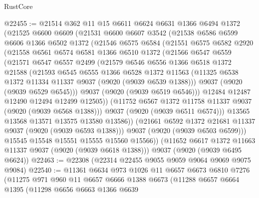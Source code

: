\begin{lexlean}{RustCore}
\begin{coremodule}
@22455 := @21514
    @362
    @11
    @15
    @6611
    @6624
    @6631
    @1366
    @6494
    @1372
    (@21525
      @6600
      @6609
      (@21531
        @6600
        @6607
        @3542
        (@21538
          @6586
          @6599
          @6606
          @1366
          @6502
          @1372
          (@21546
            @6575
            @6584
            (@21551
              @6575
              @6582
              @2920
              (@21558
                @6561
                @6574
                @6581
                @1366
                @6510
                @1372
                (@21566
                  @6547
                  @6559
                  (@21571
                    @6547
                    @6557
                    @2499
                    (@21579
                      @6546
                      @6556
                      @1366
                      @6518
                      @1372
                      @21588
                      (@21593
                        @6545
                        @6555
                        @1366
                        @6528
                        @1372
                        @11563
                        (@11325 @6538 @1372 @11334 @11337 @9037 (@9020 (@9039 @6539 @1388)))
                        @9037
                        (@9020 (@9039 @6529 @6545)))
                      @9037
                      (@9020 (@9039 @6519 @6546)))
                    @12484
                    @12487
                    @12490
                    @12494
                    @12499
                    @12505))
                (@11752 @6567 @1372 @11758 @11337 @9037 (@9020 (@9039 @6568 @1388)))
                @9037
                (@9020 (@9039 @6511 @6574)))
              @13565
              @13568
              @13571
              @13575
              @13580
              @13586))
          (@21661 @6592 @1372 @21681 @11337 @9037 (@9020 (@9039 @6593 @1388)))
          @9037
          (@9020 (@9039 @6503 @6599)))
        @15545
        @15548
        @15551
        @15555
        @15560
        @15566))
    (@11652 @6617 @1372 @11663 @11337 @9037 (@9020 (@9039 @6618 @1388)))
    @9037
    (@9020 (@9039 @6495 @6624))
@22463 := @22308 (@22314 @22455 @9055 @9059 @9064 @9069 @9075 @9084)
@22540 := @11361
    @6634
    @973
    @1026
    @11
    @6657
    @6673
    @6810
    @7276
    (@11275
      @971
      @960
      @11
      @6657
      @6666
      @1388
      @6673
      (@11288
        @6657
        @6664
        @1395
        (@11298
          @6656
          @6663
          @1366
          @6639

\end{coremodule}
\end{lexlean}
